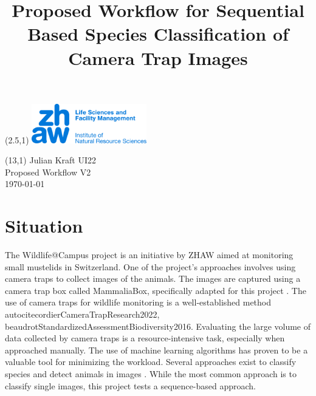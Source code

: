 \documentclass{article}
\title{Proposed Workflow for Sequential Based Species Classification of Camera Trap Images}
\makeatletter
\renewcommand{\maketitle}{
  \begin{flushleft} 
    \Large\textmd{\@title} 
    \par
  \end{flushleft}
}
\makeatother
\begin{document}
\begin{textblock}{5}(2.5,1) %
  \includegraphics[width=5cm]{resources/logo.jpg} %
\end{textblock}

\begin{textblock}{6}(13,1) %
        \raggedleft
        Julian Kraft UI22\\
        Proposed Workflow V2\\
        \today
\end{textblock}

\vspace*{1.5cm}


\maketitle


\section*{Situation} %

The Wildlife@Campus project is an initiative by ZHAW aimed at monitoring small mustelids in Switzerland.
One of the project's approaches involves using camera traps to collect images of the animals.
The images are captured using a camera trap box called MammaliaBox, specifically adapted for this
project \autocite{grafWildlifeCampusKleineSaeugetiere2022}.
The use of camera traps for wildlife monitoring is a well-established method \\autocite{cordierCameraTrapResearch2022, 
beaudrotStandardizedAssessmentBiodiversity2016}.
Evaluating the large volume of data collected by camera traps
is a resource-intensive task, especially when approached manually. The use of machine learning algorithms
has proven to be a valuable tool for minimizing the workload. Several approaches exist to classify species and
detect animals in images \autocite{tabakMachineLearningClassify2019, bohnerSemiautomaticWorkflowProcess2023}.
While the most common approach is to classify single images, this project tests a sequence-based approach.
\end{document}

